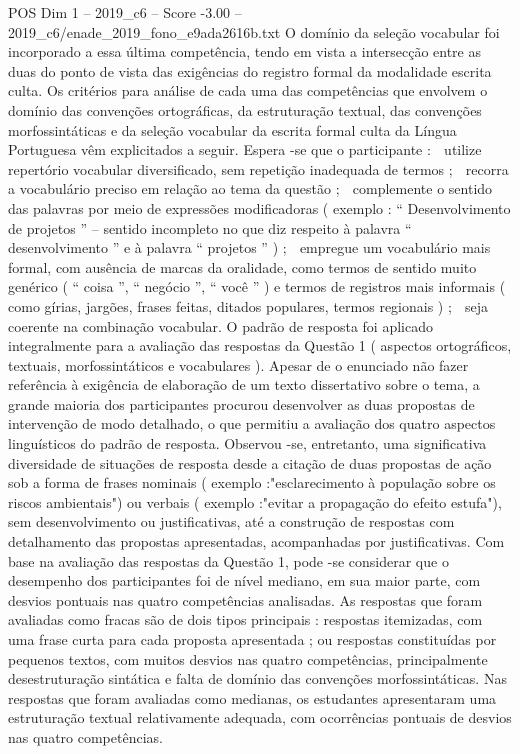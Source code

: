 \begin{textsample}{POS Dim 1 – 2019\_c6 – Score -3.00 – 2019\_c6/enade\_2019\_fono\_e9ada2616b.txt}
O domínio da seleção vocabular foi incorporado a essa última competência, tendo em vista a intersecção entre as duas do ponto de vista das exigências do registro formal da modalidade escrita culta.
Os critérios para análise de cada uma das competências que envolvem o domínio das convenções ortográficas, da estruturação textual, das convenções morfossintáticas e da seleção vocabular da escrita formal culta da Língua Portuguesa vêm explicitados a seguir.
Espera -se que o participante :  utilize repertório vocabular diversificado, sem repetição inadequada de termos ;  recorra a vocabulário preciso em relação ao tema da questão ;  complemente o sentido das palavras por meio de expressões modificadoras ( exemplo : “ Desenvolvimento de projetos ” – sentido incompleto no que diz respeito à palavra “ desenvolvimento ” e à palavra “ projetos ” ) ;  empregue um vocabulário mais formal, com ausência de marcas da oralidade, como termos de sentido muito genérico ( “ coisa ”, “ negócio ”, “ você ” ) e termos de registros mais informais ( como gírias, jargões, frases feitas, ditados populares, termos regionais ) ;  seja coerente na combinação vocabular.
O padrão de resposta foi aplicado integralmente para a avaliação das respostas da Questão 1 ( aspectos ortográficos, textuais, morfossintáticos e vocabulares ).
Apesar de o enunciado não fazer referência à exigência de elaboração de um texto dissertativo sobre o tema, a grande maioria dos participantes procurou desenvolver as duas propostas de intervenção de modo detalhado, o que permitiu a avaliação dos quatro aspectos linguísticos do padrão de resposta.
Observou -se, entretanto, uma significativa diversidade de situações de resposta desde a citação de duas propostas de ação sob a forma de frases nominais ( exemplo :"esclarecimento à população sobre os riscos ambientais") ou verbais ( exemplo :"evitar a propagação do efeito estufa"), sem desenvolvimento ou justificativas, até a construção de respostas com detalhamento das propostas apresentadas, acompanhadas por justificativas.
Com base na avaliação das respostas da Questão 1, pode -se considerar que o desempenho dos participantes foi de nível mediano, em sua maior parte, com desvios pontuais nas quatro competências analisadas.
As respostas que foram avaliadas como fracas são de dois tipos principais : respostas itemizadas, com uma frase curta para cada proposta apresentada ; ou respostas constituídas por pequenos textos, com muitos desvios nas quatro competências, principalmente desestruturação sintática e falta de domínio das convenções morfossintáticas.
Nas respostas que foram avaliadas como medianas, os estudantes apresentaram uma estruturação textual relativamente adequada, com ocorrências pontuais de desvios nas quatro competências.

\end{textsample}
